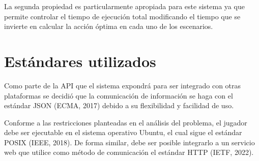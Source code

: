 La segunda propiedad es particularmente apropiada para este sistema ya que
permite controlar el tiempo de ejecución total modificando el tiempo que se
invierte en calcular la acción óptima en cada uno de los escenarios.

\section{Estándares utilizados}

Como parte de la API que el sistema expondrá para ser integrado con otras
plataformas se decidió que la comunicación de información se haga con el
estándar JSON (ECMA, 2017) debido a su flexibilidad y facilidad de uso.

Conforme a las restricciones planteadas en el análisis del problema, el jugador
debe ser ejecutable en el sistema operativo Ubuntu, el cual sigue el estándar
POSIX (IEEE, 2018). De forma similar, debe ser posible integrarlo a un servicio web que
utilice como método de comunicación el estándar HTTP (IETF, 2022).







